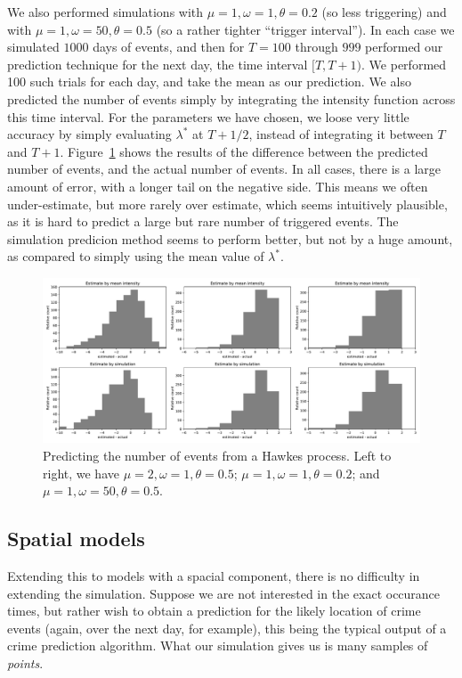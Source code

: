 \documentclass[twoside,a4paper]{article}
\theoremstyle{plain}
\theoremstyle{definition}
\begin{document}
We also performed simulations with $\mu=1,\omega=1,\theta=0.2$ (so less triggering) and
with $\mu=1,\omega=50,\theta=0.5$ (so a rather tighter ``trigger interval'').  In each case
we simulated $1000$ days of events, and then for $T=100$ through $999$ performed our prediction
technique for the next day, the time interval $[T,T+1)$.  We performed 100 such trials for
each day, and take the mean as our prediction.  We also predicted the number of
events simply by integrating the intensity function across this time interval.  For the
parameters we have chosen, we loose very little accuracy by simply evaluating $\lambda^*$ at
$T+1/2$, instead of integrating it between $T$ and $T+1$.
Figure~\ref{fig:hawkes_pred} shows the results of the difference between the predicted
number of events, and the actual number of events.  In all cases, there is a large amount
of error, with a longer tail on the negative side.  This means we often under-estimate, but
more rarely over estimate, which seems intuitively plausible, as it is hard to predict a
large but rare number of triggered events.  The simulation predicion method seems to
perform better, but not by a huge amount, as compared to simply using the mean value
of $\lambda^*$.

\begin{figure}
  \includegraphics[width=\textwidth]{../notebooks/hawkes_predictions.pdf}
  \caption{Predicting the number of events from a Hawkes process.  Left to right, we have
$\mu=2,\omega=1,\theta=0.5$; $\mu=1,\omega=1,\theta=0.2$; and $\mu=1,\omega=50,\theta=0.5$.}
  \label{fig:hawkes_pred}
\end{figure}



\subsection{Spatial models}

Extending this to models with a spacial component, there is no difficulty in extending the
simulation.  Suppose we are not interested in the exact occurance times, but rather wish to
obtain a prediction for the likely location of crime events (again, over the next day, for example),
this being the typical output of a crime prediction algorithm.  What our simulation gives us
is many samples of \emph{points}.
\end{document}
